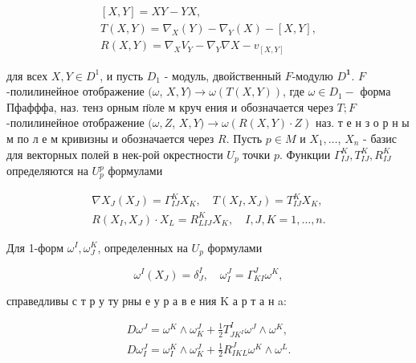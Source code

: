 \documentclass[10pt]{article}
\begin{document}
\[

\begin{gathered}

{[X, Y]=X Y-Y X,} \\

T(X, Y)=\nabla_{X}(Y)-\nabla_{Y}(X)-[X, Y], \\

R(X, Y)=\nabla_{X} V_{Y}-\nabla_{Y} \nabla X-v_{[X, Y]}

\end{gathered}

\]



для всех $X, Y \in D^{1}$, и пусть $D_{1}$ - модуль, двойственный $F$-модулю $D^{\mathbf{1}}$. $F$-полилинейное отображение $(\omega$, $X, Y) \rightarrow \omega(T(X, Y))$, где $\omega \in D_{1}-$ форма Пфафффа, наз. тенз орным п̈оле м круч ения и обозначается через $T ; F$-полилинейное отображение $(\omega, Z$, $X, Y) \rightarrow \omega(R(X, Y) \cdot Z)$ наз. т е н з о р н ы м по л е м кривизны и обозначается через $R$. Пусть $p \in M$ и $X_{1}, \ldots$, $X_{n}$ - базис для векторных полей в нек-рой окрестности $U_{p}$ точки $p$. Функции $\Gamma_{I J}^{K}, T_{I J}^{K}, R_{I J}^{K}$ определяются на $U_{p}^{p}$ формулами



\[

\begin{gathered}

\nabla X_{J}\left(X_{J}\right)=\Gamma_{I J}^{K} X_{K}, \quad T\left(X_{I}, X_{J}\right)=T_{I J}^{K} X_{K}, \\

R\left(X_{I}, X_{J}\right) \cdot X_{L}=R_{L I J}^{K} X_{K}, \quad I, J, K=1, \ldots, n .

\end{gathered}

\]



Для 1-форм $\omega^{I}, \omega_{J}^{K}$, определенных на $U_{p}$ формулами



\[

\omega^{I}\left(X_{J}\right)=\delta_{J}^{I}, \quad \omega_{I}^{J}=\Gamma_{K I}^{J} \omega^{K},

\]



справедливы с т р у ту рны е у р а в е ния K а р т а н a:



\[

\begin{gathered}

D \omega^{J}=\omega^{K} \wedge \omega_{K}^{J}+\frac{1}{2} T_{J K^{I}}^{I} \omega^{J} \wedge \omega^{K}, \\

D \omega_{I}^{J}=\omega_{I}^{K} \wedge \omega_{K}^{J}+\frac{1}{2} R_{I K L}^{J} \omega^{K} \wedge \omega^{L} .

\end{gathered}

\]
\end{document}
